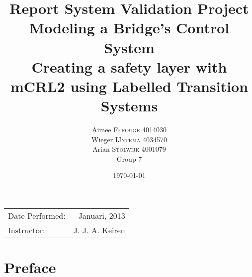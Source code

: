 \documentclass{article}
\title{Report System Validation Project \\
  Modeling a Bridge's Control System\\
  Creating a safety layer with mCRL2 using Labelled Transition Systems} %
\author{Aimee \textsc{Ferouge} 4014030 \\
  Wieger \textsc{IJntema} 4034570 \\
  Arian \textsc{Stolwijk} 4001079 \\
  Group 7} %
\date{\today} %
\begin{document}
\maketitle %

\begin{center}
\begin{tabular}{l r}
Date Performed: & Januari, 2013 \\ %
Instructor: & J. J. A. Keiren %
\end{tabular}
\end{center}

\section{Preface}

\tableofcontents











%
%
%
%
%
\end{document}
